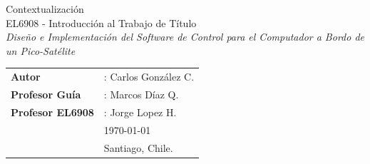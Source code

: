 \documentclass[11pt,letterpaper]{article}
\begin{document}
\newpage
\pagestyle{fancy}
\fancyhf{}
\vspace*{6cm}
\begin{center}
\Huge  {Contextualización} \\
\vspace{1cm}
\huge {EL6908 - Introducción al Trabajo de Título}\\
\vspace{1cm}
\huge {\textit{Diseño e Implementación del Software de Control para el Computador a Bordo de un Pico-Satélite}}\\
\end{center}
\vfill
\begin{flushright}
\begin{tabular}{ll}
\textbf{Autor} &: Carlos González C.\\
\textbf{Profesor Guía} &: Marcos Díaz Q.\\
\textbf{Profesor EL6908} &: Jorge Lopez H.\\
& \today\\
& Santiago, Chile.
\end{tabular}
\end{flushright}

\newpage
\pagestyle{fancy}
\fancyhf{}
\fancyhead[R]{\small \rm \textbf{\thepage}}
\renewcommand{\sectionmark}[1]{\markright{\thesection.\ #1}}
\renewcommand{\headrulewidth}{0.5pt}
\renewcommand{\footrulewidth}{0.5pt}


\tableofcontents
\listoffigures
\listoftables

\newpage
\end{document}
